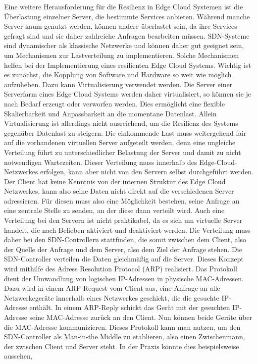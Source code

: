 Eine weitere Herausforderung für die Resilienz in Edge Cloud Systemen ist die Überlastung einzelner Server, die bestimmte Services anbieten. Während manche Server kaum genutzt werden, können andere überlastet sein, 
da ihre Services gefragt sind und sie daher zahlreiche Anfragen bearbeiten müssen. SDN-Systeme sind dynamischer als klassische Netzwerke und können daher gut geeignet sein, 
um Mechanismen zur Lastverteilung zu implementieren. Solche Mechanismen helfen bei der Implementierung eines resilienten Edge Cloud Systems. Wichtig ist es zunächst, 
die Kopplung von Software und Hardware so weit wie möglich aufzuheben. Dazu kann Virtualisierung verwendet werden. Die Server einer Serverfarm eines Edge Cloud Systems werden daher virtualisiert, 
so können sie je nach Bedarf erzeugt oder verworfen werden. Dies ermöglicht eine flexible Skalierbarkeit und Anpassbarkeit an die momentane Datenlast. Allein Virtualisierung ist allerdings nicht ausreichend, 
um die Resilienz des Systems gegenüber Datenlast zu steigern. Die einkommende Last muss weitergehend fair auf die vorhandenen virtuellen Server aufgeteilt werden, 
denn eine ungleiche Verteilung führt zu unterschiedlicher Belastung der Server und damit zu nicht notwendigen Wartezeiten. Dieser Verteilung muss innerhalb des Edge-Cloud-Netzwerkes erfolgen, 
kann aber nicht von den Servern selbst durchgeführt werden. Der Client hat keine Kenntnis von der internen Struktur des Edge Cloud Netzwerkes, kann also seine Daten nicht direkt auf die verschiedenen Server adressieren. 
Für diesen muss also eine Möglichkeit bestehen, seine Anfrage an eine zentrale Stelle zu senden, an der diese dann verteilt wird. Auch eine Verteilung bei den Servern ist nicht praktikabel, 
da es sich um virtuelle Server handelt, die nach Belieben aktiviert und deaktiviert werden. Die Verteilung muss daher bei den SDN-Controllern stattfinden, die somit zwischen dem Client, 
also der Quelle der Anfrage und dem Server, also dem Ziel der Anfrage stehen. Die SDN-Controller verteilen die Daten gleichmäßig auf die Server. Dieses Konzept wird mithilfe des Adress Resolution Protocol (ARP) realisiert. 
Das Protokoll dient der Umwandlung von logischen IP-Adressen in physische MAC-Adressen. Dazu wird in einem ARP-Request vom Client aus, eine Anfrage an alle Netzwerkegeräte innerhalb eines Netzwerkes geschickt, 
die die gesuchte IP-Adresse enthält. In einem ARP-Reply schickt das Gerät mit der gesuchten IP-Adresse seine MAC-Adresse zurück an den Client. Nun können beide Geräte über die MAC-Adresse kommunizieren. 
Dieses Protokoll kann man nutzen, um den SDN-Controller als Man-in-the Middle zu etablieren, also einen Zwischenmann, der zwischen Client und Server steht. In der Praxis könnte dies beispielsweise aussehen, 
